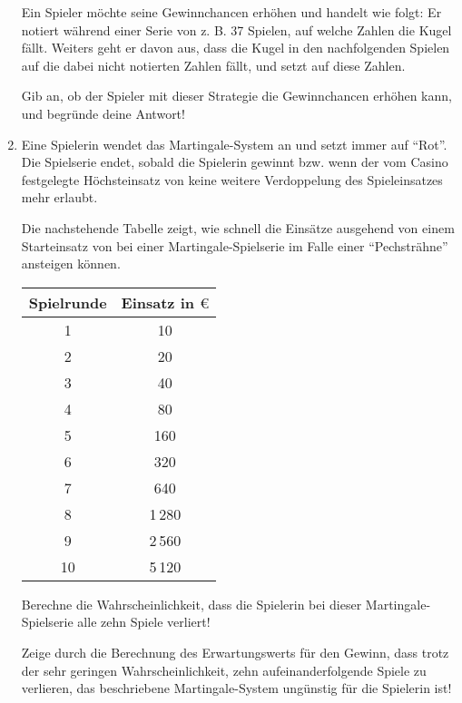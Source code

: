 \begin{langesbeispiel}
\begin{enumerate}
Ein Spieler möchte seine Gewinnchancen erhöhen und handelt wie folgt: Er notiert während einer Serie von z. B. 37 Spielen, auf welche Zahlen die Kugel fällt. Weiters geht er davon aus, dass die Kugel in den nachfolgenden Spielen auf die dabei nicht notierten Zahlen fällt, und setzt auf diese Zahlen.

Gib an, ob der Spieler mit dieser Strategie die Gewinnchancen erhöhen kann, und begründe deine Antwort!

\item Eine Spielerin wendet das Martingale-System an und setzt immer auf "`Rot"'. Die Spielserie endet, sobald die Spielerin gewinnt bzw. wenn der vom Casino festgelegte Höchsteinsatz von  keine weitere Verdoppelung des Spieleinsatzes mehr erlaubt.

Die nachstehende Tabelle zeigt, wie schnell die Einsätze ausgehend von einem Starteinsatz von  bei einer Martingale-Spielserie im Falle einer "`Pechsträhne"' ansteigen können.

\begin{center}
	\begin{tabular}{|c|c|}\hline
	\cellcolor[gray]{0.9}Spielrunde&\cellcolor[gray]{0.9}Einsatz in $\euro$\\ \hline
	1&10\\ \hline
	2&20\\ \hline
	3&40\\ \hline
	4&80\\ \hline
	5&160\\ \hline
	6&320\\ \hline
	7&640\\ \hline
	8&1\,280\\ \hline
	9&2\,560\\ \hline
	10&5\,120\\ \hline
	\end{tabular}
\end{center}

 Berechne die Wahrscheinlichkeit, dass die Spielerin bei dieser Martingale-Spielserie alle zehn Spiele verliert!

Zeige durch die Berechnung des Erwartungswerts für den Gewinn, dass trotz der sehr geringen Wahrscheinlichkeit, zehn aufeinanderfolgende Spiele zu verlieren, das beschriebene Martingale-System ungünstig für die Spielerin ist!

\end{enumerate}

\end{langesbeispiel}
